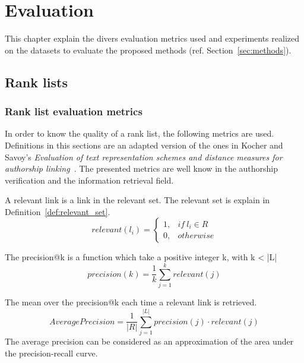 \section{Evaluation \label{sec:evaluation}}

This chapter explain the divers evaluation metrics used and experiments realized on the datasets to evaluate the proposed methods (ref. Section~\ref{sec:methods}).

\subsection{Rank lists}

\subsubsection{Rank list evaluation metrics}
\label{sec:rl_eval}

In order to know the quality of a rank list, the following metrics are used.
Definitions in this sections are an adapted version of the ones in Kocher and Savoy's \textit{Evaluation of text representation schemes and distance measures for authorship linking}~\cite{kocher_linking}.
The presented metrics are well know in the authorship verification and the information retrieval field.

\begin{definition}
  A relevant link is a link in the relevant set.
  The relevant set is explain in Definition~\ref{def:relevant_set}.
  \begin{equation}
    relevant(l_i) =
    \begin{cases}
      1, & if\ l_i \in R \\
      0, & otherwise
    \end{cases}
  \end{equation}
\end{definition}

\begin{definition}
  The precision@k is a function which take a positive integer k, with k < |L|
  \begin{equation}
    precision(k) = \frac{1}{k} \sum_{j=1}^{k} relevant(j)
  \end{equation}
\end{definition}

\begin{definition}
  The mean over the precision@k each time a relevant link is retrieved.
  \begin{equation}
    AveragePrecision = \frac{1}{|R|} \sum_{j=1}^{|L|} precision(j) \cdot relevant(j)
  \end{equation}
  The average precision can be considered as an approximation of the area under the precision-recall curve.
\end{definition}

